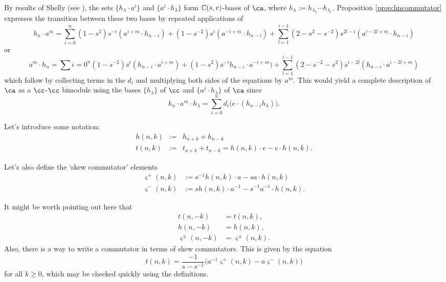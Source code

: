 \begin{remark}
By results of Shelly (see \cite[Theorem 6]{She16}), the sets $\{ h_\lambda \cdot a^i \}$ and $\{ a^i \cdot h_\lambda \}$ form $\mathbb{C} (s, v)$-bases of $\ca$, where $h_\lambda := h_{\lambda_1} \cdots h_{\lambda_r}$. Proposition \ref{prop:hncommutator} expresses the transition between these two bases by repeated applications of
\[
h_n \cdot a^m = \sum_{i=0}^n (1-s^2) s^{-i} (a^{i+m} \cdot h_{n-i}) + (1 - s^{-2}) s^i (a^{-i+m} \cdot h_{n-i}) + \sum_{l=1}^{i-1} (2 - s^2 - s^{-2}) s^{2l-i} (a^{i-2l+m} \cdot h_{n-i})
\]
or
\[
a^m \cdot h_n = \sum{i=0}^n (1-s^{-2}) s^{i} (h_{n-i} \cdot a^{i+m}) + (1 - s^{2}) s^{-i} h_{n-i} \cdot a^{-i+m}) + \sum_{l=1}^{i-1} (2 - s^{-2} - s^{2}) s^{i-2l} (h_{n-i} \cdot a^{i-2l+m})
\]
which follow by collecting terms in the $d_i$ and multiplying both sides of the equations by $a^m$. 
This would yield a complete description of $\ca$ as a $\cc$-$\cc$ bimodule using the bases $\{ h_\lambda \}$ of $\cc$ and $\{ a^j \cdot h_\lambda \}$ of $\ca$ since
\[
h_n \cdot a^m \cdot h_\lambda =  \sum_{i=0}^n d_i \big(e \cdot (h_{n-i} h_\lambda) \big).
\]
\end{remark}




Let's introduce some notation:
\begin{eqnarray*}
h(n, k) &:=& h_{n+k} + h_{n-k} \\
t(n, k) &:=& t_{n+k} + t_{n-k} = h(n, k) \cdot e - e \cdot h(n, k).
\end{eqnarray*}

Let's also define the `skew commutator' elements
\begin{align*}
\varsigma^+ (n, k) &:= s^{-1} h(n, k) \cdot a - s a \cdot h(n, k) \\
\varsigma^- (n, k) &:=  s h(n, k) \cdot a^{-1} - s^{-1} a^{-1} \cdot h(n, k).
\end{align*}

It might be worth pointing out here that 
\begin{equation}
\begin{split}
t(n, -k) &= t(n, k), \\
h(n, -k) &= h(n, k), \\
\varsigma^\pm (n, -k) &= \varsigma^\pm (n, k).
\end{split}
\end{equation}
Also, there is a way to write a commutator in terms of skew commutators. This is given by the equation
\begin{equation} \label{eq:skewcommutator3}
t(n, k) = \frac{-1}{s-s^{-1}} \big( a^{-1} \varsigma^+(n, k) - a \varsigma^-(n, k) \big)
\end{equation}
for all $k \geq 0$, which may be checked quickly using the definitions.

